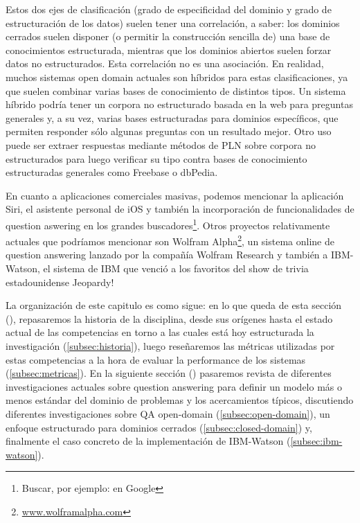 Estos dos ejes de clasificación (grado de especificidad del dominio y grado de estructuración de los datos) suelen tener una correlación, a saber: los dominios cerrados suelen disponer (o permitir la construcción sencilla de) una base de conocimientos estructurada, mientras que los dominios abiertos suelen forzar datos no estructurados. Esta correlación no es una asociación. En realidad, muchos sistemas open domain actuales son híbridos para estas clasificaciones, ya que suelen combinar varias bases de conocimiento de distintos tipos. Un sistema híbrido podría tener un corpora no estructurado basada en la web para preguntas generales y, a su vez, varias bases estructuradas para dominios específicos, que permiten responder sólo algunas preguntas con un resultado mejor. Otro uso puede ser extraer respuestas mediante métodos de PLN sobre corpora no estructurados para luego verificar su tipo contra bases de conocimiento estructuradas generales como Freebase o dbPedia.

En cuanto a aplicaciones comerciales masivas, podemos mencionar la aplicación Siri, el asistente personal de iOS y también la incorporación de funcionalidades de question aswering en los grandes buscadores\footnote{Buscar, por ejemplo:  en Google}.  Otros proyectos relativamente actuales que podríamos mencionar son Wolfram Alpha\footnote{\url{www.wolframalpha.com}}, un sistema online de question answering lanzado por la compañía Wolfram Research y también a IBM-Watson, el sistema de IBM que venció a los favoritos del show de trivia estadounidense Jeopardy!

La organización de este capitulo es como sigue: en lo que queda de esta sección (), repasaremos la historia de la disciplina, desde sus orígenes hasta el estado actual de las competencias en torno a las cuales está hoy estructurada la investigación (\ref{subsec:historia}), luego reseñaremos las métricas utilizadas por estas competencias a la hora de evaluar la performance de los sistemas (\ref{subsec:metricas}). En la siguiente sección () pasaremos revista de diferentes investigaciones actuales sobre question answering para definir un modelo más o menos estándar del dominio de problemas y los acercamientos típicos, discutiendo diferentes investigaciones sobre QA open-domain (\ref{subsec:open-domain}), un enfoque estructurado para dominios cerrados (\ref{subsec:closed-domain}) y, finalmente el caso concreto de la implementación de IBM-Watson (\ref{subsec:ibm-watson}).


